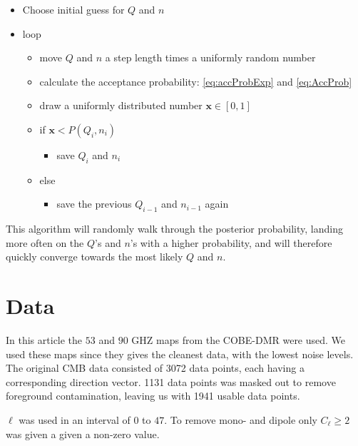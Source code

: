 \documentclass{emulateapj}
\begin{document}
\begin{itemize}
\item Choose initial guess for $Q$ and $n$
\item loop
    \begin{itemize}
     \item move $Q$ and $n$ a step length times a uniformly random number
     \item calculate the acceptance probability: \eqref{eq:accProbExp} and \eqref{eq:AccProb}
     \item draw a uniformly distributed number $\mathbf{x}\in[0,1]$
     \item if $\mathbf{x} < P(Q_i,n_i)$
     \begin{itemize}
     \item save $Q_i$ and $n_i$
     \end{itemize}
     \item else
     \begin{itemize}
     \item save the previous $Q_{i-1}$ and $n_{i-1}$ again
     \end{itemize}
     \end{itemize}
\end{itemize}

This algorithm will randomly walk through the posterior probability, landing more often on the $Q$'s and $n$'s with a higher probability, and will therefore quickly converge towards the most likely $Q$ and $n$.




%
%

\section{Data}
\label{sec:data}

In this article the $53$ and $90$ GHZ maps from the COBE-DMR were used. We used these maps since they gives the cleanest data, with the lowest noise levels. The original CMB data consisted of 3072 data points, each having a corresponding direction vector. 1131 data points was masked out to remove foreground contamination, leaving us with 1941 usable data points.

$\ell$ was used in an interval of $0$ to $47$. To remove mono- and dipole only $C_\ell \geq 2$ was given a given a non-zero value.
\end{document}
